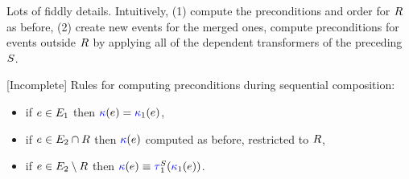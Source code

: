 Lots of fiddly details.  Intuitively, (1) compute the preconditions and order
for $R$ as before, (2) create new events for the merged ones, compute
preconditions for events outside $R$ by applying all of the dependent
transformers of the preceding $S$.

[Incomplete] Rules for computing preconditions during sequential composition:
\begin{itemize}
\item if $e\in E_1$ then ${\color{blue}\kappa}(e)={\color{blue}\kappa}_1(e)$,
\item if $e\in E_2\cap R$ then ${\color{blue}\kappa}(e)$ computed as before, restricted to $R$,
\item if $e\in E_2\setminus R$ then $\labelingForm(\aEv) \riff \aTr[1]{\umEvs}{\labelingForm_1(\aEv)}$.
\end{itemize}


